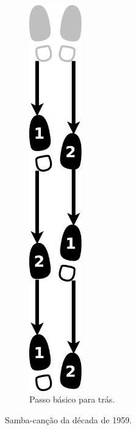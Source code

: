 \begin{itemize}
\begin{figure}[h]
\begin{subfigure}[b]{0.4\textwidth}
        \centering
	\includegraphics[width=0.25\textwidth]{chapters/cap-historia-sambagafieira/samba-cancao-basico-tras.eps}
        \caption{Passo básico para trás.}
        \label{fig:samba-cancao-basico-tras}
    \end{subfigure}
    \caption{Samba-canção da década de 1959.}\label{fig:samba-cancao-basico}
\end{figure}



\end{itemize}
